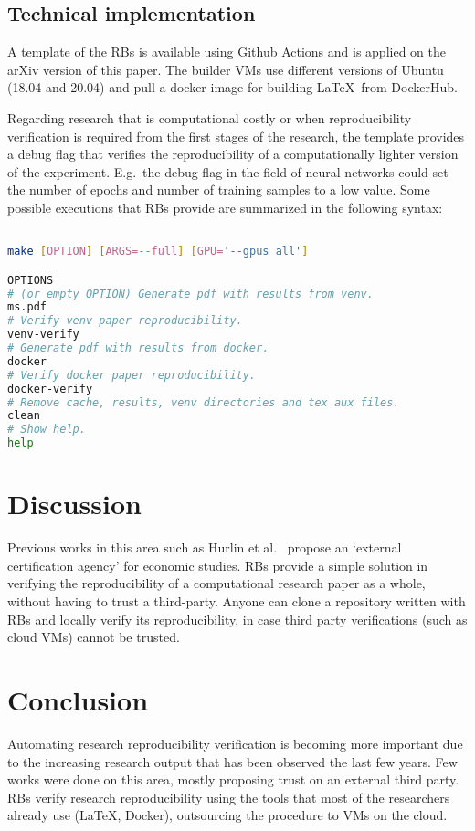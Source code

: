 \documentclass[journal]{IEEEtran}
\begin{document}
\subsection{Technical implementation}
A template of the RBs is available using Github Actions and is applied on the arXiv version of this paper.
The builder VMs use different versions of Ubuntu (18.04 and 20.04) and pull a docker image for building \LaTeX\ from DockerHub.

Regarding research that is computational costly or when reproducibility verification is required from the first stages of the research, the template provides a debug flag that verifies the reproducibility of a computationally lighter version of the experiment.
E.g.\ the debug flag in the field of neural networks could set the number of epochs and number of training samples to a low value.
Some possible executions that RBs provide are summarized in the following syntax:
\begin{lstlisting}[language=Bash, style=lststyle, caption={Makefile call syntax from the shell.}, captionpos=b]

make [OPTION] [ARGS=--full] [GPU='--gpus all']

OPTIONS
# (or empty OPTION) Generate pdf with results from venv.
ms.pdf
# Verify venv paper reproducibility.
venv-verify
# Generate pdf with results from docker.
docker
# Verify docker paper reproducibility.
docker-verify
# Remove cache, results, venv directories and tex aux files.
clean
# Show help.
help
\end{lstlisting}

\section{Discussion}
Previous works in this area such as Hurlin et al.~\cite{hurlin2019reproducibility} propose an `external certification agency' for economic studies.
RBs provide a simple solution in verifying the reproducibility of a computational research paper as a whole, without having to trust a third-party.
Anyone can clone a repository written with RBs and locally verify its reproducibility, in case third party verifications (such as cloud VMs) cannot be trusted.

\section{Conclusion}
Automating research reproducibility verification is becoming more important due to the increasing research output that has been observed the last few years.
Few works were done on this area, mostly proposing trust on an external third party.
RBs verify research reproducibility using the tools that most of the researchers already use (\LaTeX, Docker), outsourcing the procedure to VMs on the cloud.
\end{document}
